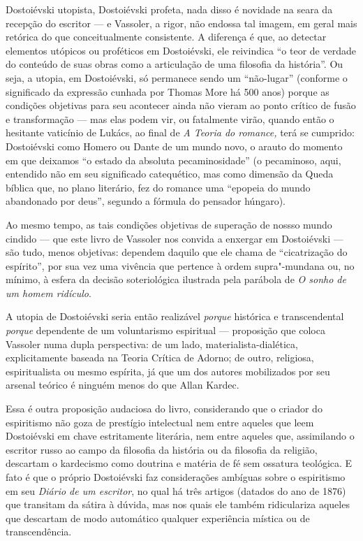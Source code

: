 Dostoiévski utopista, Dostoiévski profeta, nada disso é novidade na
seara da recepção do escritor --- e Vassoler, a rigor, não endossa tal
imagem, em geral mais retórica do que conceitualmente consistente. A
diferença é que, ao detectar elementos utópicos ou proféticos em
Dostoiévski, ele reivindica ``o teor de verdade do conteúdo de suas
obras como a articulação de uma filosofia da história''. Ou seja, a
utopia, em Dostoiévski, só permanece sendo um ``não-lugar'' (conforme o
significado da expressão cunhada por Thomas More há 500 anos) porque as
condições objetivas para seu acontecer ainda não vieram ao ponto crítico
de fusão e transformação --- mas elas podem vir, ou fatalmente virão,
quando então o hesitante vaticínio de Lukács, ao final de \emph{A Teoria
do romance,} terá se cumprido: Dostoiévski como Homero ou Dante de um
mundo novo, o arauto do momento em que deixamos ``o estado da absoluta
pecaminosidade'' (o pecaminoso, aqui, entendido não em seu significado
catequético, mas como dimensão da Queda bíblica que, no plano literário,
fez do romance uma ``epopeia do mundo abandonado por deus'', segundo a
fórmula do pensador húngaro).

Ao mesmo tempo, as tais condições objetivas de superação de nossso mundo
cindido --- que este livro de Vassoler nos convida a enxergar em
Dostoiévski --- são tudo, menos objetivas: dependem daquilo que ele chama
de ``cicatrização do espírito'', por sua vez uma vivência que pertence à
ordem supra"-mundana ou, no mínimo, à esfera da decisão soteriológica
ilustrada pela parábola de \emph{O sonho de um homem ridículo}.

A utopia de Dostoiévski seria então realizável \emph{porque} histórica e
transcendental \emph{porque} dependente de um voluntarismo espiritual ---
proposição que coloca Vassoler numa dupla perspectiva: de um lado,
materialista-dialética, explicitamente baseada na Teoria Crítica de
Adorno; de outro, religiosa, espiritualista ou mesmo espírita, já que um
dos autores mobilizados por seu arsenal teórico é ninguém menos do que
Allan Kardec.

Essa é outra proposição audaciosa do livro, considerando que o criador
do espiritismo não goza de prestígio intelectual nem entre aqueles que
leem Dostoiévski em chave estritamente literária, nem entre aqueles que,
assimilando o escritor russo ao campo da filosofia da história ou da
filosofia da religião, descartam o kardecismo como doutrina e matéria de
fé sem ossatura teológica. E fato é que o próprio Dostoiévski faz
considerações ambíguas sobre o espiritismo em seu \emph{Diário de um
escritor}, no qual há três artigos (datados do ano de 1876) que
transitam da sátira à dúvida, mas nos quais ele também ridiculariza
aqueles que descartam de modo automático qualquer experiência mística ou
de transcendência.

